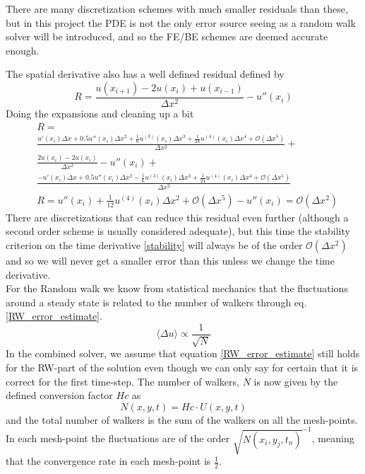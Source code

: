 There are many discretization schemes with much smaller residuals than these, but in this project the PDE is not the only error source seeing as a random walk solver will be introduced, and so the FE/BE schemes are deemed accurate enough.

The spatial derivative also has a well defined residual defined by
\begin{equation}
R = \frac{u(x_{i+1})-2u(x_i)+u(x_{i-1})}{\Delta x^2}-u''(x_i) 
\end{equation}
Doing the expansions and cleaning up a bit 
\begin{align*}
 &R =\\& \frac{u'(x_i)\Delta x +0.5u''(x_i)\Delta x^2 + \frac{1}{6}u^{(3)}(x_i)\Delta x^3 +\frac{1}{24}u^{(4)}(x_i)\Delta x^4 +\mathcal{O}(\Delta x^5)}{\Delta x^2}+\\ &\frac{2u(x_i)-2u(x_i)}{\Delta x^2} -u''(x_i) +\\
 &\frac{-u'(x_i)\Delta x +0.5u''(x_i)\Delta x^2 - \frac{1}{6}u^{(3)}(x_i)\Delta x^3 +\frac{1}{24}u^{(4)}(x_i)\Delta x^4 +\mathcal{O}(\Delta x^5)}{\Delta x^2} \\
&R = u''(x_i) +\frac{1}{12}u^{(4)}(x_i)\Delta x^2 + \mathcal{O}(\Delta x^5)  -u''(x_i) = \mathcal{O}(\Delta x^2) 
\end{align*}
There are discretizations that can reduce this residual even further (although a second order scheme is usually considered adequate), but this time the stability criterion on the time derivative \ref{stability} will always be of the order $\mathcal{O}(\Delta x^2)$ and so we will never get a smaller error than this unless we change the time derivative. \\
For the Random walk we know from statistical mechanics that the fluctuations around a steady state is related to the number of walkers through eq. \ref{RW_error_estimate}.
\begin{equation}\label{RW_error_estimate}
 \langle\Delta u\rangle \propto \frac{1}{\sqrt{N}}
\end{equation}
In the combined solver, we assume that equation \ref{RW_error_estimate} still holds for the RW-part of the solution even though we can only say for certain that it is correct for the first time-step. 
The number of walkers, $N$ is now given by the defined conversion factor $Hc$ as 
\begin{equation}
 N(x,y,t) = Hc\cdot U(x,y,t)
\end{equation}
and the total number of walkers is the sum of the walkers on all the mesh-points. 
In each mesh-point the fluctuations are of the order $\sqrt{N(x_i,y_j,t_n)}^{-1}$, meaning that the convergence rate in each mesh-point is $\frac{1}{2}$. 

